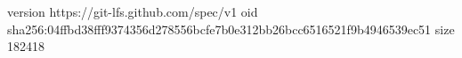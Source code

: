 version https://git-lfs.github.com/spec/v1
oid sha256:04ffbd38fff9374356d278556bcfe7b0e312bb26bcc6516521f9b4946539ec51
size 182418
